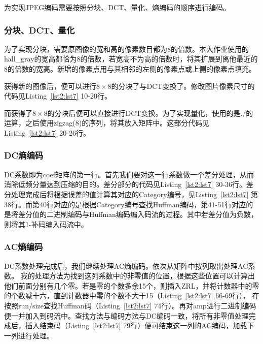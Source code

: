 \documentclass[a4paper]{article}
\begin{document}
	为实现JPEG编码需要按照分块、DCT、量化、熵编码的顺序进行编码。
	
	\subsubsection{分块、DCT、量化}
	为了实现分块，需要原图像的宽和高的像素数目都为8的倍数。本大作业使用的hall\_gray的宽高都恰为8的倍数，若宽高不为高的倍数时，将其扩展到离他最近的8的倍数的宽高。新增的像素点用与其相邻的左侧的像素点或上侧的像素点填充。
	
	获得新的图像后，便可以进行$8 \times 8$的分块了与DCT变换了。修改图片像素尺寸的代码见Listing~\ref{lst2:lst7} 10-20行。
	
	而获得了$8 \times 8$的分块后便可以直接进行DCT变换。为了实现量化，使用的是./的运算，之后使用zigzag(8)的序列，将其放入矩阵中。这部分代码见Listing~\ref{lst2:lst7} 20-26行。
	
	\subsubsection{DC熵编码}
	
	DC系数即为coef矩阵的第一行。首先我们要对这一行系数做一个差分处理，从而消除低频分量达到压缩的目的。差分部分的代码见Listing~\ref{lst2:lst7} 30-36行。差分处理完成后将根据误差的值计算其对应的Category编号，见Listing~\ref{lst2:lst7} 第38行。而第40行对应的是根据Category编号查找Huffman编码，第41-51行对应的是将差分值的二进制编码与Huffman编码编入码流的过程。其中若差分值为负数，则将其1-补码编入码流中。
	
	\subsubsection{AC熵编码}
	
	DC系数处理完成后，我们继续处理AC熵编码。依次从矩阵中按列取出处理AC系数。	我的处理方法为找到这列系数中的非零值的位置，根据这些位置可以计算出他们前面分别有几个零。若是零的个数多余15个，则插入ZRL，并将计数器中的零的个数减十六，直到计数器中零的个数不大于15（Listing~\ref{lst2:lst7} 66-69行），
	在按照run/size查找Huffman码（Listing~\ref{lst2:lst7} 74行）。再对amp进行二进制编码便一并加入到码流中。查找方法与编码方法与DC编码一致，将所有非零值处理完成后，插入结束码（Listing~\ref{lst2:lst7} 79行）便可结束这一列的AC编码，加载下一列进行处理。
	
	
	
\end{document}
